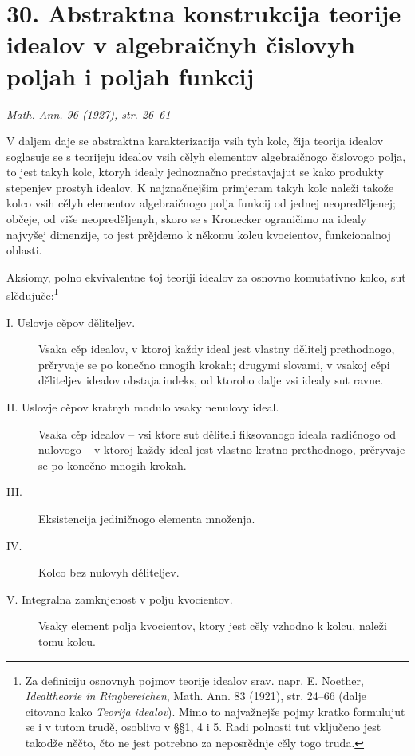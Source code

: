 \documentclass[11pt]{article}
\begin{document}
\section*{30. Abstraktna konstrukcija teorije idealov v algebraičnyh čislovyh poljah i poljah funkcij}

\begin{center}
\emph{Math. Ann. 96 (1927), str. 26--61}
\end{center}

V daljem daje se abstraktna karakterizacija vsih tyh kolc, čija teorija idealov soglasuje se s teorijeju idealov vsih cělyh elementov algebraičnogo čislovogo polja, to jest takyh kolc, ktoryh idealy jednoznačno predstavjajut se kako produkty stepenjev prostyh idealov. K najznačnejšim primjeram takyh kolc naleži takože kolco vsih cělyh elementov algebraičnogo polja funkcij od jednej neopreděljenej; občeje, od više neopreděljenyh, skoro se s Kronecker ograničimo na idealy najvyšej dimenzije, to jest prějdemo k někomu kolcu kvocientov, funkcionalnoj oblasti.

Aksiomy, polno ekvivalentne toj teoriji idealov za osnovno komutativno kolco, sut slědujuče:\footnote{Za definiciju osnovnyh pojmov teorije idealov srav. napr. E. Noether, \emph{Idealtheorie in Ringbereichen}, Math. Ann. 83 (1921), str. 24--66 (dalje citovano kako \emph{Teorija idealov}). Mimo to najvažnejše pojmy kratko formulujut se i v tutom trudě, osoblivo v §§1, 4 i 5. Radi polnosti tut vključeno jest takodže něčto, čto ne jest potrebno za neposrědnje cěly togo truda.}

\begin{description}
\item[I. Uslovje cěpov děliteljev.] Vsaka cěp idealov, v ktoroj každy ideal jest vlastny dělitelj prethodnogo, prěryvaje se po konečno mnogih krokah; drugymi slovami, v vsakoj cěpi děliteljev idealov obstaja indeks, od ktoroho dalje vsi idealy sut ravne.
\item[II. Uslovje cěpov kratnyh modulo vsaky nenulovy ideal.] Vsaka cěp idealov -- vsi ktore sut děliteli fiksovanogo ideala različnogo od nulovogo -- v ktoroj každy ideal jest vlastno kratno prethodnogo, prěryvaje se po konečno mnogih krokah.
\item[III.] Eksistencija jediničnogo elementa množenja.
\item[IV.] Kolco bez nulovyh děliteljev.
\item[V. Integralna zamknjenost v polju kvocientov.] Vsaky element polja kvocientov, ktory jest cěly vzhodno k kolcu, naleži tomu kolcu.
\end{description}
\end{document}
